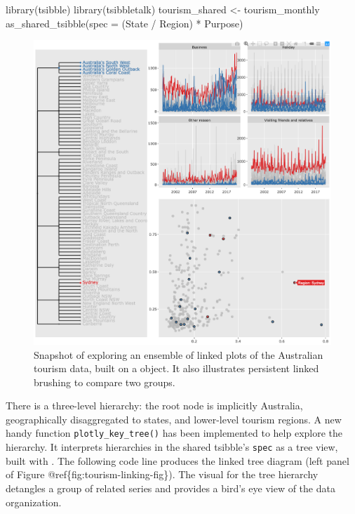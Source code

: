 \begin{Schunk}
\begin{Sinput}
library(tsibble)
library(tsibbletalk)
tourism_shared <- tourism_monthly %
  as_shared_tsibble(spec = (State / Region) * Purpose)
\end{Sinput}
\end{Schunk}

\begin{Schunk}
\begin{figure}

{\centering \includegraphics[width=\textwidth]{img/tourism-linking} 

}

\caption[Snapshot of exploring an ensemble of linked plots of the Australian tourism data, built on a  object]{Snapshot of exploring an ensemble of linked plots of the Australian tourism data, built on a  object. It also illustrates persistent linked brushing to compare two groups.}\label{fig:tourism-linking-fig}
\end{figure}
\end{Schunk}

\noindent There is a three-level hierarchy: the root node is implicitly
Australia, geographically disaggregated to states, and lower-level
tourism regions. A new handy function \texttt{plotly\_key\_tree()} has
been implemented to help explore the hierarchy. It interprets
hierarchies in the shared tsibble's \texttt{spec} as a tree view, built
with . The following code line produces the linked tree
diagram (left panel of Figure @ref\{fig:tourism-linking-fig\}). The
visual for the tree hierarchy detangles a group of related series and
provides a bird's eye view of the data organization.

